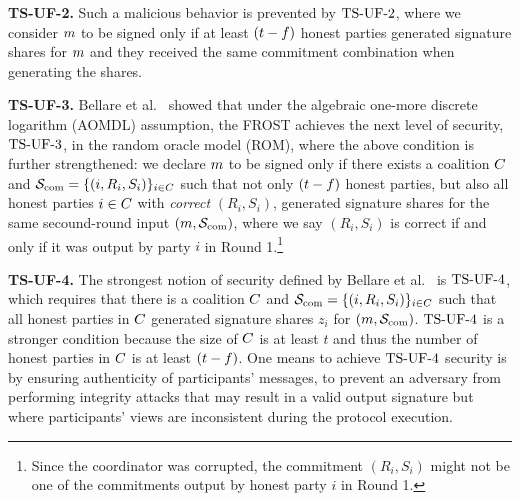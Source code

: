
\medskip

\textbf{TS-UF-2.}
Such a malicious behavior is prevented by $\mathrm{TS}\mbox{-}\mathrm{UF}\mbox{-}{2}$, where
we consider $m$ to be signed only if at least $(t - f)$ honest parties generated signature shares for $m$ and they received the same commitment combination when generating the shares.

\medskip

\textbf{TS-UF-3.} Bellare et al.~\cite{BellareCKMTZ22} showed that under the algebraic one-more discrete logarithm (AOMDL) assumption, the FROST achieves the next level of security, $\mathrm{TS}\mbox{-}\mathrm{UF}\mbox{-}{3}$, in the random oracle model (ROM), where the above condition is further strengthened:
we declare $m$ to be signed only if there exists  a coalition $C$ and $\mathcal{S}_{\rm com}=\{ (i, R_{i}, S_{i})\}_{i \in C}$ such that not only  $(t - f)$ honest parties, but also all honest parties $i\in C$ with \emph{correct} $(R_{i}, S_{i})$, generated signature shares  for the same secound-round input $(m, \mathcal{S}_{\rm com})$, where we say $(R_{i}, S_{i})$ is correct if and only if it was output by party $i$ in Round 1.\footnote{Since the coordinator was corrupted, the commitment $(R_{i}, S_{i})$ might not be one of the commitments output by honest party $i$ in Round 1.}


\medskip

\textbf{TS-UF-4.}
The strongest notion of security defined by Bellare et al.~\cite{BellareCKMTZ22} is $\mathrm{TS}\mbox{-}\mathrm{UF}\mbox{-}{4}$,
which requires that there is a coalition $C$ and $\mathcal{S}_{\rm com}=\{ (i, R_{i}, S_{i})\}_{i \in C}$ such that all honest parties in $C$ generated  signature shares  $z_i$ for $(m, \mathcal{S}_{\rm com})$.
$\mathrm{TS}\mbox{-}\mathrm{UF}\mbox{-}{4}$ is a stronger condition because the size of $C$ is at least $t$ and thus the number of honest parties in $C$ is at least  $(t - f)$.
One means to achieve $\mathrm{TS}\mbox{-}\mathrm{UF}\mbox{-}{4}$ security is by ensuring authenticity of participants' messages,
to prevent an adversary from performing integrity attacks that may result in a valid output signature but where participants' views are inconsistent during the protocol execution.

